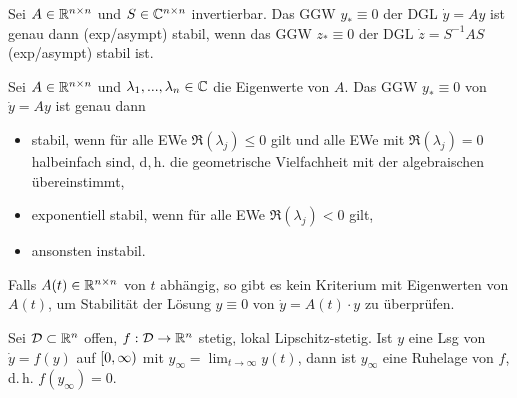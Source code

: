 \documentclass{cheat-sheet}
\newcommand{\D}{\mathcal{D}}
\begin{document}

\begin{satz}
  Sei $A \in \mathbb{R}^{n \times n}$ und $S \in \mathbb{C}^{n \times n}$ invertierbar. Das GGW $y_* \equiv 0$ der DGL $\dot{y} = Ay$ ist genau dann (exp/asympt) stabil, wenn das GGW $z_* \equiv 0$ der DGL $\dot{z} = S^{-1} A S$ (exp/asympt) stabil ist.
\end{satz}

\begin{satz}
  Sei $A \in \mathbb{R}^{n \times n}$ und $\lambda_1, ..., \lambda_n \in \mathbb{C}$ die Eigenwerte von $A$. Das GGW $y_* \equiv 0$ von $\dot{y} = Ay$ ist genau dann
  \begin{itemize}
    \item stabil, wenn für alle EWe $\Re(\lambda_j) \leq 0$ gilt und alle EWe mit $\Re(\lambda_j) = 0$ halbeinfach sind, d,\,h. die geometrische Vielfachheit mit der algebraischen übereinstimmt,
    \item exponentiell stabil, wenn für alle EWe $\Re(\lambda_j) < 0$ gilt,
    \item ansonsten instabil.
  \end{itemize}
\end{satz}


\begin{bem}
  Falls $A(t) \in \mathbb{R}^{n \times n}$ von $t$ abhängig, so gibt es kein Kriterium mit Eigenwerten von $A(t)$, um Stabilität der Lösung $y \equiv 0$ von $\dot{y} = A(t) \cdot y$ zu überprüfen.
\end{bem}


\begin{lem}
  Sei $\D \subset \R^n$ offen, $f : \D \to \R^n$ stetig, lokal Lipschitz-stetig. Ist $y$ eine Lsg von $\dot{y} = f(y)$ auf $\left[ 0, \infty \right)$ mit $y_{\infty} = \lim_{t \to \infty} y(t)$, dann ist $y_{\infty}$ eine Ruhelage von $f$, d.\,h. $f(y_{\infty}) = 0$.
\end{lem}
\end{document}
